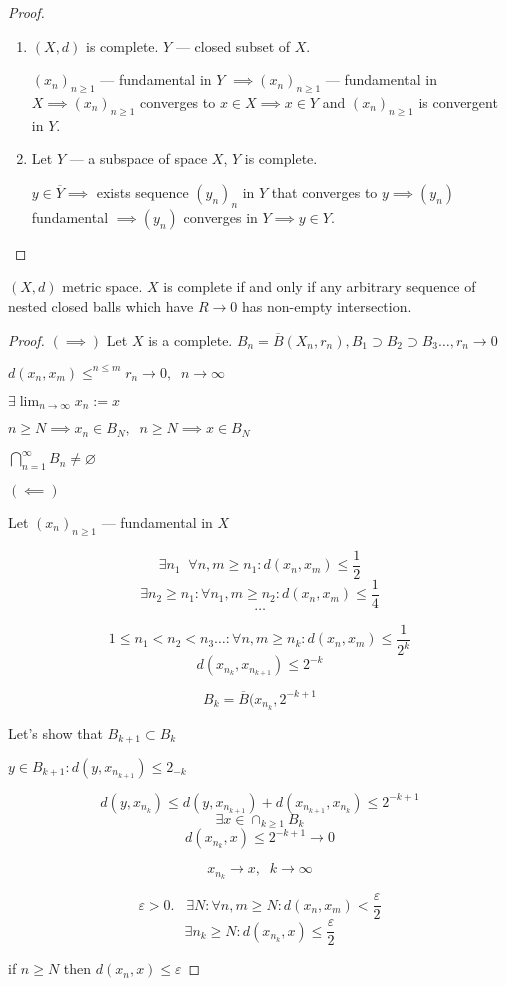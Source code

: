 \begin{proof}
\begin{enumerate}
\item 
  $(X, d)$ is complete. $Y$ --- closed subset of $X$.

  $(x_n)_{n \ge 1}$ --- fundamental in $Y$ $\implies (x_n)_{n \ge  1}$ --- fundamental in $X \implies (x_n)_{n \ge 1}$ converges to $x \in  X \implies x \in  Y$ and $(x_n)_{n \ge 1}$ is convergent in $Y$.

\item
  Let  $Y$ --- a subspace of space $X$, $Y$ is complete.

  $y \in \overline{Y} \implies $ exists sequence $(y_n)_{n}$ in $Y$ that converges to $y \implies (y_n)$ fundamental $\implies (y_n)$ converges in $Y \implies y \in  Y$.
\end{enumerate}
\end{proof}


\begin{theorem}
 $(X,d)$ metric space. 
 $X$ is complete if and only if any arbitrary sequence of nested closed balls which have $R\to 0$ has non-empty intersection.
\end{theorem}

\begin{proof}
  $(\implies)$
  Let $X$ is a complete. $B_n = \overline{B} (X_n, r_n), B_1 \supset B_2 \supset B_3 \ldots, r_n \to  0$ 

$d(x_n, x_m) \le^{n \le  m} r_n \to  0, \;\; n \to \infty $

$\exists \lim_{n \to \infty} x_n := x$

$n \ge  N \implies x_n \in  B_N, \;\; n \ge  N \implies x \in B_N$

$\bigcap_{n=1}^{\infty} B_n \neq \varnothing$


$(\impliedby)$

Let $(x_n)_{n \ge 1}$ --- fundamental in $X$

 \[ \exists n_1 \;\; \forall n,m \ge  n_1: d(x_{n}, x_{m}) \le  \frac{1}{2} \] 
 \[ \exists n_2 \ge n_1 : \forall n_1, m \ge  n_2 : d(x_n, x_m) \le  \frac{1}{4}\] 
 \[ \ldots \] 

 \[ 1\le  n_1 < n_2 < n_3 \ldots : \forall n,m \ge  n_k : d(x_n, x_m) \le \frac{1}{2^{k}} \] 
 \[ d(x_{n_k}, x_{n_{k+1}}) \le  2^{-k} \] 

 \[ B_k = \overline{B}(x_{n_k}, 2^{-k+1}  \] 

 Let's show that $B_{k+1} \subset B_k$

 $y \in  B_{k+1}: d(y, x_{n_{k+1}} ) \le 2_{-k}$

 \[ d(y, x_{n_k}) \le d(y, x_{n_{k+1}}) + d(x_{n_{k+1}}, x_{n_k}) \le  2^{-k+1} \] 
 \[ \exists x \in  \cap_{k \ge  1} B_k \] 
 \[ d(x_{n_k}, x) \le  2^{-k+1} \to  0 \] 

 \[ x_{n_k} \to  x, \;\; k \to \infty \] 

 \[ \varepsilon > 0. \;\;\; \exists N: \forall n,m \ge  N : d(x_n, x_m) < \frac{\varepsilon}{2} \] 
 \[ \exists n_k \ge  N: d(x_{n_k}, x) \le  \frac{\varepsilon}{2} \] 

if $n \ge N$ then $d(x_n, x) \le  \varepsilon$

\end{proof}


